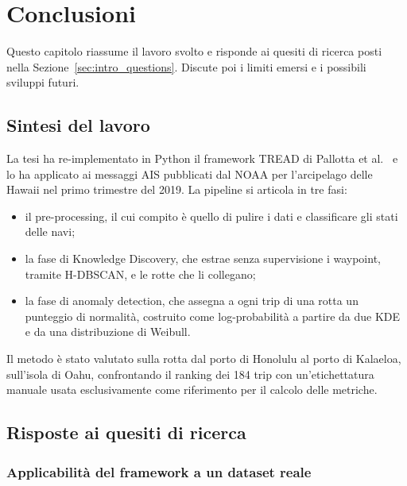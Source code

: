 \chapter{Conclusioni}
\label{chap:conclusions}

Questo capitolo riassume il lavoro svolto e risponde ai quesiti di ricerca posti nella
Sezione~\ref{sec:intro_questions}. Discute poi i limiti emersi e i possibili sviluppi futuri.

\section[Sintesi del lavoro]{Sintesi del lavoro}\label{sec:concl_summary}

La tesi ha re-implementato in Python il framework TREAD di Pallotta et al.~\cite{pallotta} e lo ha
applicato ai messaggi AIS pubblicati dal NOAA per l'arcipelago delle Hawaii nel primo trimestre del
2019. La pipeline si articola in tre fasi:
\begin{itemize}
    \item il pre-processing, il cui compito è quello di pulire i dati e classificare gli stati delle navi;
    \item la fase di Knowledge Discovery, che estrae senza supervisione i waypoint, tramite H-DBSCAN, e le rotte che li collegano;
    \item la fase di anomaly detection, che assegna a ogni trip di una rotta un punteggio di normalità, costruito come log-probabilità a partire da due KDE e da una distribuzione di Weibull.
\end{itemize}

Il metodo è stato valutato sulla rotta dal porto di Honolulu al porto di Kalaeloa, sull'isola di
Oahu, confrontando il ranking dei 184 trip con un'etichettatura manuale usata esclusivamente come
riferimento per il calcolo delle metriche.

\section[Risposte ai quesiti di ricerca]{Risposte ai quesiti di ricerca}\label{sec:concl_questions}

\subsection[Applicabilità del framework a un dataset reale]{Applicabilità del framework a un dataset reale}

